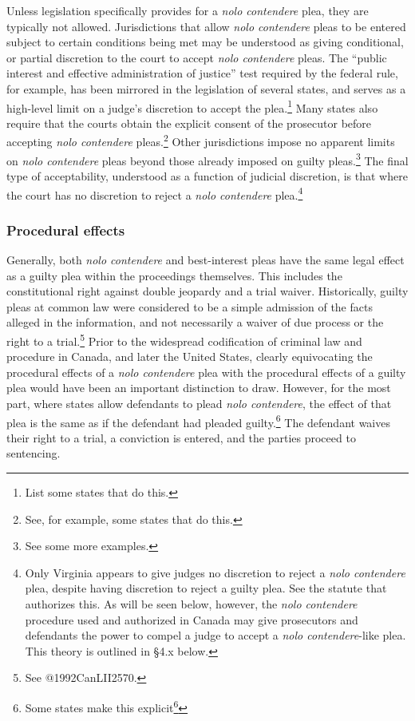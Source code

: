 Unless legislation specifically provides for a \textit{nolo contendere} plea, they are typically not allowed. Jurisdictions that allow \textit{nolo contendere} pleas to be entered subject to certain conditions being met may be understood as giving conditional, or partial discretion to the court to accept \textit{nolo contendere} pleas. The ``public interest and effective administration of justice” test required by the federal rule, for example, has been mirrored in the legislation of several states, and serves as a high-level limit on a judge's discretion to accept the plea.\footnote{List some states that do this.} Many states also require that the courts obtain the explicit consent of the prosecutor before accepting \textit{nolo contendere} pleas.\footnote{See, for example, some states that do this.} Other jurisdictions impose no apparent limits on \textit{nolo contendere} pleas beyond those already imposed on guilty pleas.\footnote{See some more examples.} The final type of acceptability, understood as a function of judicial discretion, is that where the court has no discretion to reject a \textit{nolo contendere} plea.\footnote{Only Virginia appears to give judges no discretion to reject a \textit{nolo contendere} plea, despite having discretion to reject a guilty plea. See the statute that authorizes this. As will be seen below, however, the \textit{nolo contendere} procedure used and authorized in Canada may give prosecutors and defendants the power to compel a judge to accept a \textit{nolo contendere}-like plea. This theory is outlined in §4.x below.}

\subsubsection{Procedural effects}

Generally, both \textit{nolo contendere} and best-interest pleas have the same legal effect as a guilty plea within the proceedings themselves. This includes the constitutional right against double jeopardy and a trial waiver. Historically, guilty pleas at common law were considered to be a simple admission of the facts alleged in the information, and not necessarily a waiver of due process or the right to a trial.\footnote{See @1992CanLII2570.} Prior to the widespread codification of criminal law and procedure in Canada, and later the United States, clearly equivocating the procedural effects of a \textit{nolo contendere} plea with the procedural effects of a guilty plea would have been an important distinction to draw. However, for the most part, where states allow defendants to plead \textit{nolo contendere}, the effect of that plea is the same as if the defendant had pleaded guilty.\footnote{Some states make this explicit\footnote{See eg Oregon (O.R.S. § 135.345. No contest plea as conviction), Rhode Island (RI R REV Rule 609), New Mexico (NM ST § 30-1-11. Criminal sentence permitted only upon conviction), and Louisiana (LA C.Cr.P. Art. 552(4). Pleas at the arraignment)}} The defendant waives their right to a trial, a conviction is entered, and the parties proceed to sentencing.

